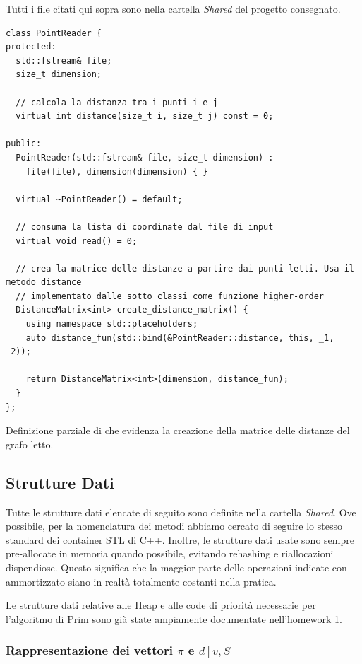 Tutti i file citati qui sopra sono nella cartella \textit{Shared} del progetto consegnato.

\begin{listing}[!ht]
\begin{verbatim}
class PointReader {
protected:
  std::fstream& file;
  size_t dimension;

  // calcola la distanza tra i punti i e j
  virtual int distance(size_t i, size_t j) const = 0;

public:
  PointReader(std::fstream& file, size_t dimension) :
    file(file), dimension(dimension) { }

  virtual ~PointReader() = default;

  // consuma la lista di coordinate dal file di input
  virtual void read() = 0;
    
  // crea la matrice delle distanze a partire dai punti letti. Usa il metodo distance 
  // implementato dalle sotto classi come funzione higher-order
  DistanceMatrix<int> create_distance_matrix() {
    using namespace std::placeholders;
    auto distance_fun(std::bind(&PointReader::distance, this, _1, _2));

    return DistanceMatrix<int>(dimension, distance_fun);
  }
};
\end{verbatim}
\caption{Definizione parziale di  che evidenza la creazione della matrice delle distanze del grafo letto.}
\label{listing:point-reader}
\end{listing}

\subsection{Strutture Dati}

Tutte le strutture dati elencate di seguito sono definite nella cartella \textit{Shared}.
Ove possibile, per la nomenclatura dei metodi abbiamo cercato di seguire lo stesso standard dei container STL di C++.
Inoltre, le strutture dati usate sono sempre pre-allocate in memoria quando possibile, evitando rehashing e riallocazioni dispendiose. Questo significa che la maggior parte delle operazioni indicate con \complexityConstant{} ammortizzato siano in realtà totalmente costanti nella pratica.

\noindent Le strutture dati relative alle Heap e alle code di priorità necessarie per l'algoritmo di Prim sono già state ampiamente documentate nell'homework 1.

\subsubsection{Rappresentazione dei vettori $\pi$ e $d[v,S]$}

